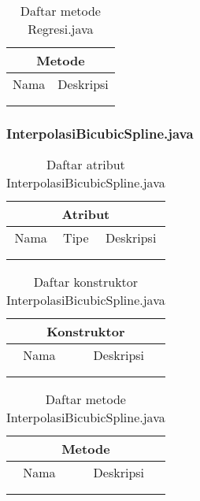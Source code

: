 \begin{table}[H]
    \centering
    \begin{tabular}{c|c}
        \hline
        \hline
        \multicolumn{2}{c}{\textbf{Metode}}\\
        \hline
        \hline
         Nama  & Deskripsi \\
         \hline 
         \hline 
         &  \\
         &  \\
    \end{tabular}
    \caption{Daftar metode Regresi.java}
\end{table}

\subsubsection{InterpolasiBicubicSpline.java}

\begin{table}[H]
    \centering
    \begin{tabular}{c|c|c}
        \hline
        \hline
        \multicolumn{3}{c}{\textbf{Atribut}}\\
        \hline
        \hline
         Nama & Tipe & Deskripsi \\
         \hline 
         \hline 
         &  & \\
         &  & \\
    \end{tabular}
    \caption{Daftar atribut InterpolasiBicubicSpline.java}
\end{table}

\begin{table}[H]
    \centering
    \begin{tabular}{c|c}
        \hline
        \hline
        \multicolumn{2}{c}{\textbf{Konstruktor}}\\
        \hline
        \hline
         Nama  & Deskripsi \\
         \hline 
         \hline 
         &  \\
         &  \\
    \end{tabular}
    \caption{Daftar konstruktor InterpolasiBicubicSpline.java}
\end{table}

\begin{table}[H]
    \centering
    \begin{tabular}{c|c}
        \hline
        \hline
        \multicolumn{2}{c}{\textbf{Metode}}\\
        \hline
        \hline
         Nama  & Deskripsi \\
         \hline 
         \hline 
         &  \\
         &  \\
    \end{tabular}
    \caption{Daftar metode InterpolasiBicubicSpline.java}
\end{table}

